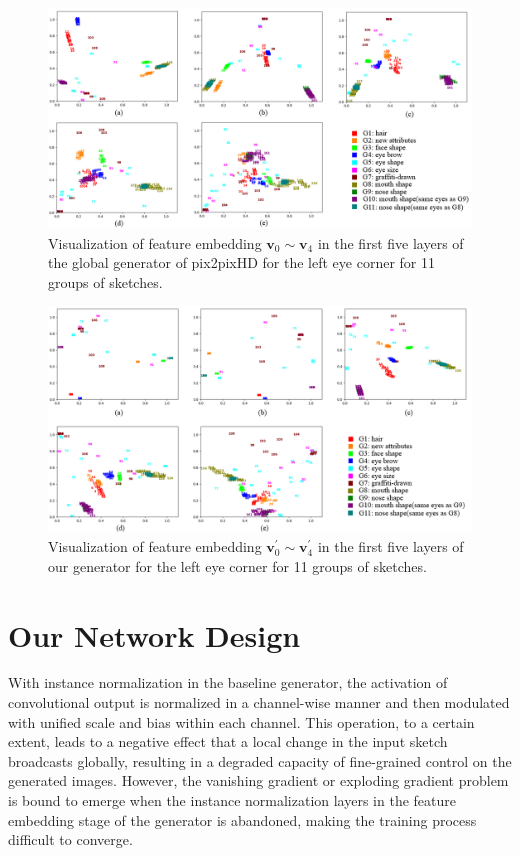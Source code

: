 \documentclass[10pt,twocolumn,letterpaper]{article}
\begin{document}
\begin{figure}[htb]
	\centering
	\includegraphics[width=0.9 \textwidth]{pca_0.png}
	\caption{Visualization of feature embedding $\boldsymbol{v}_0\sim\boldsymbol{v}_4$ in the first five layers of the global generator of pix2pixHD for the left eye corner for 11 groups of sketches.  }
	\label{fig:pca_0}
\end{figure}      

\begin{figure}[htb]
	\centering
	\includegraphics[width=0.9 \textwidth]{pca_1.png}
	\caption{Visualization of feature embedding $\boldsymbol{v}_0^{'}\sim\boldsymbol{v}_4^{'}$ in the first five layers of our generator for the left eye corner for 11 groups of sketches.}
	\label{fig:pca_1}
\end{figure}


\section{Our Network Design}\label{sec:network}
%
With instance normalization in the baseline generator, the activation of convolutional output is normalized in a channel-wise manner and then modulated with unified scale and bias within each channel. 
This operation, to a certain extent, leads to a negative effect that a local change in the input sketch broadcasts globally, resulting in a degraded capacity of fine-grained control on the generated images.
However, the vanishing gradient or exploding gradient problem is bound to emerge when the instance normalization layers in the feature embedding stage of the generator is abandoned, making the training process difficult to converge. 
 
\end{document}

